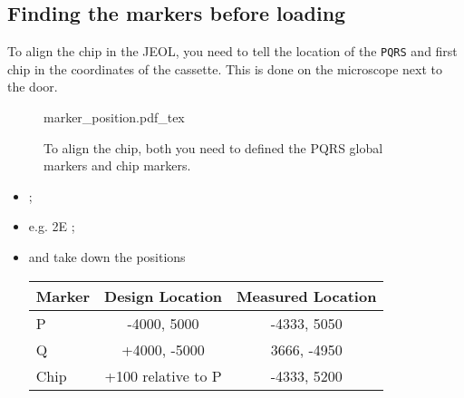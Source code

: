 \subsection{Finding the markers before loading}
\label{sec:marker_location}

To align the  chip in the JEOL, you need  to tell  the
location of  the \texttt{PQRS} and  first chip in the  coordinates of
the cassette. This is done on the microscope next to the door.

\begin{figure}[h]
  \centering
  \def\svgwidth{8cm}{marker_position.pdf_tex}
  \caption{\small To  align the  chip, both you  need to  defined the
    PQRS global markers and chip markers.\label{fig:marker_position}}
\end{figure}

\begin{framed}\noindent

\end{framed}

\begin{itemize}
\item {};
\item {} e.g.  2E \ira {};

\item {} and  take down the
  positions  \ira  {}


  \begin{table}[htbp]
    \centering
    \begin{tabular}{|l|c|c|}
      \hline
      \textbf{Marker} & \textbf{Design Location} & \textbf{Measured Location}\\\hline
      P & -4000, 5000 & -4333, 5050\\
      Q & +4000, -5000 & 3666, -4950\\
      Chip & +100 relative to P & -4333, 5200 \\\hline
    \end{tabular}
  \end{table}
\end{itemize}

